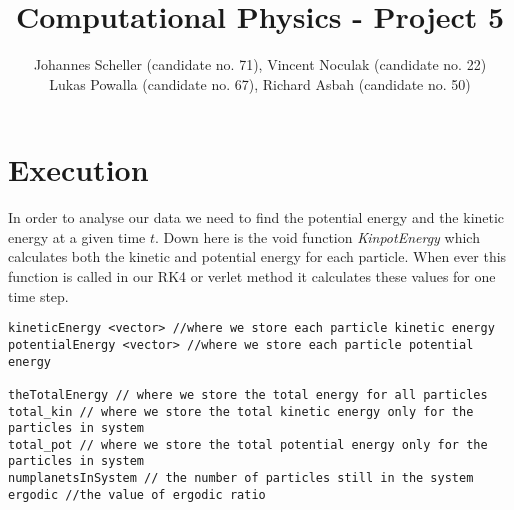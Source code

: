 \documentclass[10pt,a4paper]{article}
\author{Johannes Scheller (candidate no. 71), Vincent Noculak (candidate no. 22)\\ Lukas Powalla (candidate no. 67), Richard Asbah (candidate no. 50) }
\title{Computational Physics - Project 5}
\begin{document}
\maketitle
\newpage
\tableofcontents
\newpage




\section{Execution}

In order to analyse our data we need to find the potential energy and the kinetic energy at a given time $t$. Down here is the void function \emph{KinpotEnergy} which calculates both the kinetic and potential energy for each particle. When ever this function is called in our RK4 or verlet method it calculates these values for one time step.
\begin{lstlisting}
kineticEnergy <vector> //where we store each particle kinetic energy 
potentialEnergy <vector> //where we store each particle potential energy 

theTotalEnergy // where we store the total energy for all particles
total_kin // where we store the total kinetic energy only for the particles in system
total_pot // where we store the total potential energy only for the particles in system
numplanetsInSystem // the number of particles still in the system
ergodic //the value of ergodic ratio 
\end{lstlisting}
\end{document}
